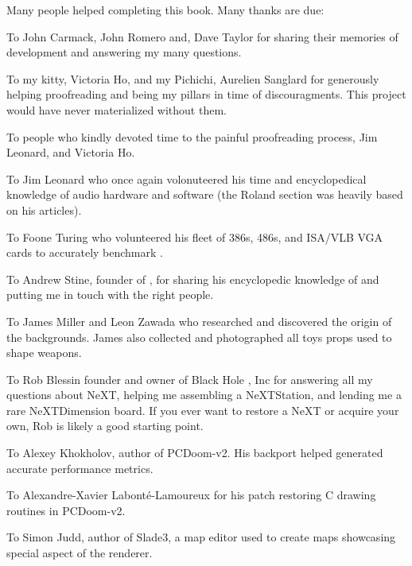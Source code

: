 Many people helped completing this book. Many thanks are due:\\
\par
To John Carmack, John Romero and, Dave Taylor for sharing their memories of \doom{} development and answering my many questions.\\
\par
To my kitty, Victoria Ho, and my Pichichi, Aurelien Sanglard for generously helping proofreading and being my pillars in time of discouragments. This project would have never materialized without them.\\ 
\par
To people who kindly devoted time to the painful proofreading process, Jim Leonard, and Victoria Ho.\\
\par
To Jim Leonard who once again volonuteered his time and encyclopedical knowledge of audio hardware and software (the Roland section was heavily based on his articles).\\
\par
To Foone Turing who volunteered his fleet of 386s, 486s, and ISA/VLB VGA cards to accurately benchmark \doom{}.\\
\par
To Andrew Stine, founder of , for sharing his encyclopedic knowledge of \doom{} and putting me in touch with the right people.\\
\par
To James Miller and Leon Zawada who researched and discovered the origin of the backgrounds. James also collected and photographed all toys props used to shape \doom{} weapons.\\
\par
To Rob Blessin founder and owner of Black Hole , Inc for answering all my questions about NeXT, helping me assembling a NeXTStation, and lending me a rare NeXTDimension board. If you ever want to restore a NeXT or acquire your own, Rob is likely a good starting point.\\
\par
To Alexey Khokholov, author of PCDoom-v2. His backport helped generated accurate performance metrics.\\
\par
To Alexandre-Xavier Labont\'e-Lamoureux for his patch restoring C drawing routines in PCDoom-v2.\\
\par
To Simon Judd, author of Slade3, a map editor used to create maps showcasing special aspect of the renderer.\\
